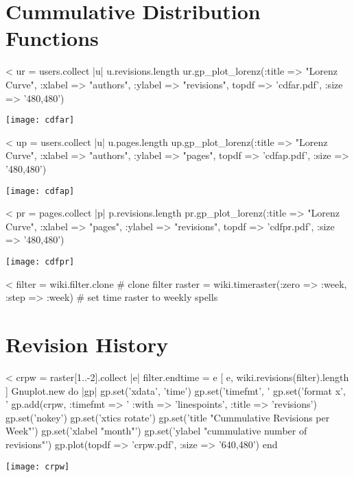 \documentclass{scrartcl}
\begin{document}




\section{Cummulative Distribution Functions} %
\label{sec:cummulative_distribution_functions}

<%
ur = users.collect { |u| u.revisions.length }
ur.gp_plot_lorenz(:title => "Lorenz Curve", :xlabel => "authors",
 :ylabel => "revisions", topdf => 'cdfar.pdf', :size => '480,480')
\begin{center}
  \texttt{[image: cdfar]}
\end{center}

<%
up = users.collect { |u| u.pages.length }
up.gp_plot_lorenz(:title => "Lorenz Curve", :xlabel => "authors", :ylabel => "pages", topdf => 'cdfap.pdf', :size => '480,480')
\begin{center}
  \texttt{[image: cdfap]}
\end{center}

<%
pr = pages.collect { |p| p.revisions.length }
pr.gp_plot_lorenz(:title => "Lorenz Curve", :xlabel => "pages", :ylabel => "revisions", topdf => 'cdfpr.pdf', :size => '480,480')
\begin{center}
  \texttt{[image: cdfpr]}
\end{center}



<%
filter = wiki.filter.clone # clone filter
raster = wiki.timeraster(:zero => :week, :step => :week) # set time raster to weekly spells

\section{Revision History} %
\label{sec:revision_history}

<%
crpw = raster[1..-2].collect { |e| filter.endtime = e 
	[ e, wiki.revisions(filter).length ]
	}
Gnuplot.new do |gp|
	gp.set('xdata', 'time')
	gp.set('timefmt', '%
	gp.set('format x', '%
	gp.add(crpw, :timefmt => '%
		:with => 'linespoints', 
		:title => 'revisions')
	gp.set('nokey')
	gp.set('xtics rotate')
	gp.set('title "Cummulative Revisions per Week"')
	gp.set('xlabel "month"')
	gp.set('ylabel "cummulative number of revisions"')
	gp.plot(topdf => 'crpw.pdf', :size => '640,480')
end
\begin{center}
  \texttt{[image: crpw]}
\end{center}
\end{document}
